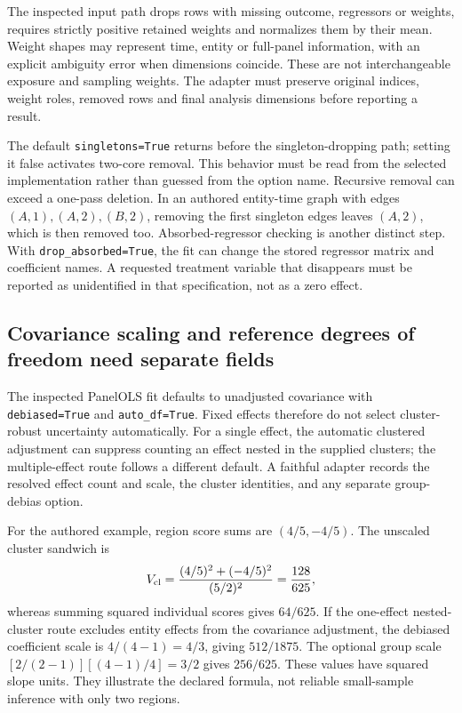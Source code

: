 The inspected input path drops rows with missing outcome, regressors or
weights, requires strictly positive retained weights and normalizes them
by their mean. Weight shapes may represent time, entity or full-panel
information, with an explicit ambiguity error when dimensions coincide.
These are not interchangeable exposure and sampling weights. The adapter
must preserve original indices, weight roles, removed rows and final
analysis dimensions before reporting a result.
\citep{exec24_lmpanel_source}

The default \texttt{singletons=True} returns before the singleton-dropping
path; setting it false activates two-core removal. This behavior must be
read from the selected implementation rather than guessed from the option
name. Recursive removal can exceed a one-pass deletion. In an authored
entity-time graph with edges $(A,1),(A,2),(B,2)$, removing the first singleton
edges leaves $(A,2)$, which is then removed too. Absorbed-regressor checking
is another distinct step. With \texttt{drop\_absorbed=True}, the fit can
change the stored regressor matrix and coefficient names. A requested
treatment variable that disappears must be reported as unidentified in
that specification, not as a zero effect.
\citep{exec24_lmpanel_source,exec24_lmpanel_reference}

\subsection{Covariance scaling and reference degrees of freedom need separate fields}
The inspected PanelOLS fit defaults to unadjusted covariance with
\texttt{debiased=True} and \texttt{auto\_df=True}. Fixed effects therefore
do not select cluster-robust uncertainty automatically. For a single effect,
the automatic clustered adjustment can suppress counting an effect nested
in the supplied clusters; the multiple-effect route follows a different
default. A faithful adapter records the resolved effect count and scale,
the cluster identities, and any separate group-debias option.
\citep{exec24_lmpanel_source}

For the authored example, region score sums are $(4/5,-4/5)$. The unscaled
cluster sandwich is
\[
 V_{\rm cl}=\frac{(4/5)^2+(-4/5)^2}{(5/2)^2}
             =\frac{128}{625},
\]
whereas summing squared individual scores gives $64/625$. If the one-effect
nested-cluster route excludes entity effects from the covariance adjustment,
the debiased coefficient scale is $4/(4-1)=4/3$, giving $512/1875$.
The optional group scale $[2/(2-1)][(4-1)/4]=3/2$ gives $256/625$.
These values have squared slope units. They illustrate the declared
formula, not reliable small-sample inference with only two regions.
\citep{exec24_lmpanel_reference}

